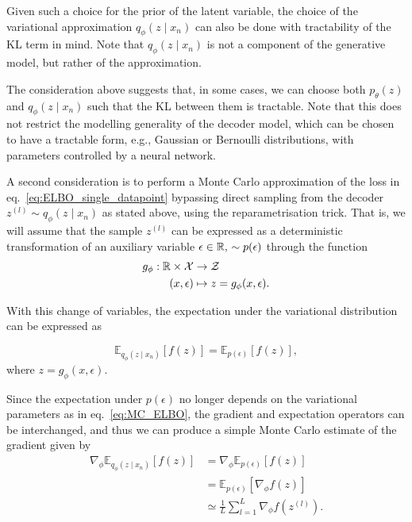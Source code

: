 Given such a choice for the prior of the latent variable, the choice of the variational approximation $q_\phi(z \mid x_n)$ can also be done with tractability of the KL term in mind. Note that $q_\phi(z \mid x_n)$ is not a component of the generative model, but rather of the approximation. 

\begin{remark}
    \label{rem:tractable_KL}
    The consideration above suggests that, in some cases, we can choose both $p_\theta(z)$ and $q_\phi(z \mid x_n)$  such that the KL between them is tractable. Note that this does not restrict the modelling generality of the decoder model, which can be chosen to have a tractable form, e.g., Gaussian or Bernoulli distributions, with parameters controlled by a neural network.
\end{remark}

A second consideration is to perform a Monte Carlo approximation of the loss in eq.~\eqref{eq:ELBO_single_datapoint} bypassing direct sampling from the decoder $z^{(l)}\sim q_\phi(z \mid x_n)$ as stated above, using the reparametrisation trick. That is, we will assume that the sample $z^{(l)}$ can be expressed as a deterministic transformation of an auxiliary variable $\epsilon\in{\mathbb R},\,\sim p(\epsilon)$ through the function
\begin{align}
    g_\phi: {\mathbb R} \times {\mathcal X} &\to {\mathcal Z}\\
    (x, \epsilon) &\mapsto z = g_\phi(x, \epsilon).    
\end{align}

With this change of variables, the expectation under the variational distribution can be expressed as 

\begin{equation}
    \mathbb{E}_{q_\phi(z \mid x_n)}\left[f(z)\right] = \mathbb{E}_{p(\epsilon)}\left[f(z)\right],
\end{equation}
where $ z = g_\phi(x,\epsilon)$. 

    Since the expectation under $p(\epsilon)$ no longer depends on the variational parameters as in eq.~\eqref{eq:MC_ELBO}, the gradient and expectation operators can be interchanged, and thus we can produce a simple Monte Carlo estimate of the gradient given by 
    \begin{align}
        \nabla_\phi \mathbb{E}_{q_\phi(z \mid x_n)}\left[f(z)\right] 
        & = \nabla_\phi\mathbb{E}_{p(\epsilon)}\left[f(z)\right]\nonumber\\
        & = \mathbb{E}_{p(\epsilon)}\left[ \nabla_\phi f(z)\right]\nonumber\\
        & \simeq \frac{1}{L}\sum_{l=1}^{L} \nabla_\phi f(z^{(l)}).
    \end{align}

